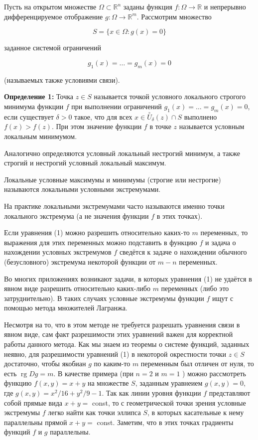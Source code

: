 \documentclass[a4paper,12pt]{article} %
\begin{document}
Пусть на открытом множестве $\Omega \subset \mathbb{R}^{n}$ заданы функция $f: \Omega \rightarrow \mathbb{R}$ и непрерывно дифференцируемое отображение $g: \Omega \rightarrow \mathbb{R}^{m}$. Рассмотрим множество

$$
S=\{x \in \Omega: g(x)=0\}
$$

заданное системой ограничений

$$
g_{1}(x)=\ldots=g_{m}(x)=0
$$

(называемых также условиями связи).

\textbf{Определение 1:} Точка $z \in S$ называется точкой условного локального строгого минимума функции $f$ при выполнении ограничений $g_{1}(x)=\ldots=g_{m}(x)=0$, если существует $\delta>0$ такое, что для всех $x \in \stackrel{\circ}{U}_{\delta}(z) \cap S$ выполнено $f(x)>f(z)$. При этом значение функции $f$ в точке $z$ называется условным локальным минимумом.

Аналогично определяются условный локальный нестрогий минимум, а также строгий и нестрогий условный локальный максимум.

Локальные условные максимумы и минимумы (строгие или нестрогие) называются локальными условными экстремумами.

На практике локальными экстремумами часто называются именно точки локального экстремума (а не значения функции $f$ в этих точках).

Если уравнения (1) можно разрешить относительно каких-то $m$ переменных, то выражения для этих переменных можно подставить в функцию $f$ и задача о нахождении условных экстремумов $f$ сведётся к задаче о нахождении обычного (безусловного) экстремума некоторой функции от $m-n$ переменных.

Во многих приложениях возникают задачи, в которых уравнения (1) не удаётся в явном виде разрешить относительно каких-либо $m$ переменных (либо это затруднительно). В таких случаях условные экстремумы функции $f$ ищут с помощью метода множителей Лагранжа.

Несмотря на то, что в этом методе не требуется разрешать уравнения связи в явном виде, сам факт разрешимости этих уравнений важен для корректной работы данного метода. Как мы знаем из теоремы о системе функций, заданных неявно, для разрешимости уравнений (1) в некоторой окрестности точки $z \in S$ достаточно, чтобы якобиан $g$ по каким-то $m$ переменным был отличен от нуля, то есть $\operatorname{rg} D g=m$. В качестве примера (при $n=2$ и $m=1$ ) можно рассмотреть функцию $f(x, y)=x+y$ на множестве $S$, заданным уравнеием $g(x, y)=0$, где $g(x, y)=x^{2} / 16+y^{2} / 9-1$. Так как линии уровня функции $f$ представляют собой прямые вида $x+y=$ const, то с геометрической точки зрения условные экстремумы $f$ легко найти как точки эллипса $S$, в которых касательные к нему параллельны прямой $x+y=$ const. Заметим, что в этих точках градиенты функций $f$ и $g$ параллельны.
\end{document}
